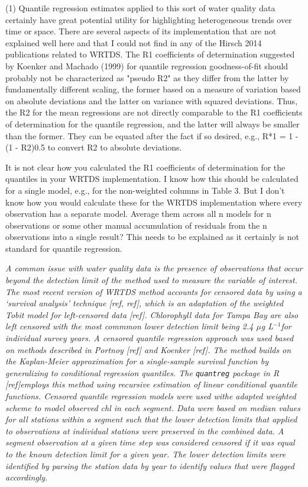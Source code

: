 \documentclass[letterpaper,12pt,oneside]{article}\usepackage[]{graphicx}\usepackage[]{color}
\newcommand{\mugl}{$\mu$g L$^{-1}$}
\begin{document}
(1)  Quantile regression estimates applied to this sort of water quality data certainly have great potential utility for highlighting heterogeneous trends over time or space.  There are several aspects of its implementation that are not explained well here and that I could not find in any of the Hirsch 2014 publications related to WRTDS. 
The R1 coefficients of determination suggested by Koenker and Machado (1999) for quantile regression goodness-of-fit should probably not be characterized as "pseudo R2" as they differ from the latter by fundamentally different scaling, the former based on a measure of variation based on absolute deviations and the latter on variance with squared deviations.  Thus, the R2 for the mean regressions are not directly comparable to the R1 coefficients of determination for the quantile regression, and the latter will always be smaller than the former.   They can be equated after the fact if so desired, e.g., R*1 = 1 - (1 - R2)0.5 to convert R2 to absolute deviations.  

It is not clear how you calculated the R1 coefficients of determination for the quantiles in your WRTDS implementation.  I know how this should be calculated for a single model, e.g., for the non-weighted columns in Table 3.  But I don't know how you would calculate these for the WRTDS implementation where every observation has a separate model.  Average them across all n models for n observations or some other manual accumulation of residuals from the n observations into a single result?  This needs to be explained as it certainly is not standard for quantile regression.

{\it A common issue with water quality data is the presence of observations that occur beyond the detection limit of the method used to measure the variable of interest.  The most recent version of \ac{WRTDS} method accounts for censored data by using a `survival analysis' technique [ref, ref], which is an adaptation of the weighted Tobit model for left-censored data [ref].  Chlorophyll data for Tampa Bay are also left censored with the most commmon lower detection limit being 2.4 \mugl for individual survey years.  A censored quantile regression approach was used based on methods described in Portnoy [ref] and Koenker [ref].  The method builds on the Kaplan-Meier approximation for a single-sample survival function by generalizing to conditional regression quantiles.  The \texttt{quantreg} package in R [ref]employs this method using recursive estimation of linear conditional quantile functions.  Censored quantile regression models were used withe adapted weighted scheme to model observed \ac{chl} in each segment.  Data were based on median values for all stations within a segment such that the lower detection limits that applied to observations at individual stations were preserved in the combined data.  A segment observation at a given time step was considered censored if it was equal to the known detection limit for a given year.  The lower detection limits were identified by parsing the station data by year to identify values that were flagged accordingly.}
\end{document}
